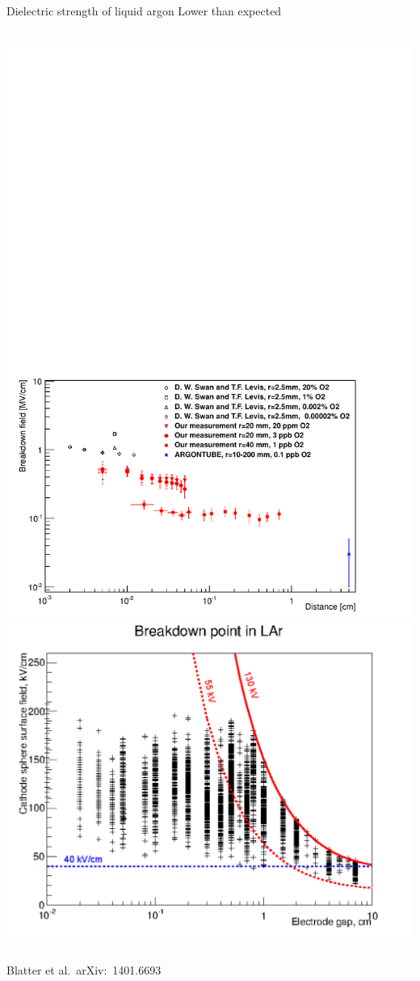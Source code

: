 \documentclass[]{beamer}
\newcommand*{\emphcol}{blue}
\begin{document}
\begin{frame}{Dielectric strength of liquid argon}{\color{\emphcol} Lower than expected}
	\begin{columns}[c]
		\centering
		\includegraphics[viewport=18 10 511 351, clip, width=\textwidth]{defence/breakdown_plot}
		\centering
		\includegraphics[width=\textwidth]{defence/breakdown_summary}
	\end{columns}
	\centering
	{\tiny Blatter et al.\ arXiv:~1401.6693~\cite{breakdown_14}}\\
\end{frame}
\end{document}
